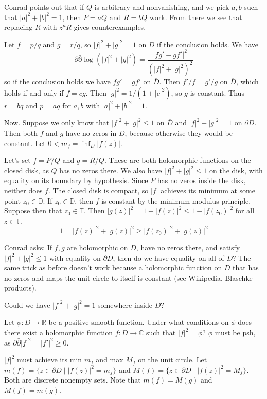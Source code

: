 \documentclass[11pt]{amsart}
\theoremstyle{definition}
\newcommand{\kk}[1]{\mathbb{#1}}
\def\ov#1{\overline{#1}}
\begin{document}
Conrad points out that if $Q$ is arbitrary and nonvanishing, and we pick
$a,b$ such that $|a|^2 + |b|^2 = 1$, then $P = aQ$ and $R = bQ$ work.
From there we see that replacing $R$ with $z^n R$ gives counterexamples.


Let $f = p/q$ and $g = r/q$, so $|f|^2 + |g|^2 = 1$ on $D$ if the conclusion holds.
We have
$$
\partial \bar\partial \log(|f|^2 + |g|^2)
=
\frac{|f g' - g f'|^2}{(|f|^2 + |g|^2)^2}
$$
so if the conclusion holds we have $fg' = gf'$ on $\ov D$.
Then $f'/f = g'/g$ on $\ov D$, which holds if and only if $f = c g$.
Then $|g|^2 = 1/(1+|c|^2)$, so $g$ is constant.
Thus $r = bq$ and $p = aq$ for $a,b$ with $|a|^2 + |b|^2 = 1$.

Now.
Suppose we only know that $|f|^2 + |g|^2 \leq 1$ on $\ov D$ and $|f|^2 + |g|^2
= 1$ on $\partial D$.
Then both $f$ and $g$ have no zeros in $D$, because otherwise they would be
constant.
Let $0 < m_f = \inf_{D}|f(z)|$.


Let's set $f = P/Q$ and $g = R/Q$. These are both holomorphic functions on the
closed disk, as $Q$ has no zeros there. We also have $|f|^2 + |g|^2 \leq 1$ on
the disk, with equality on its boundary by hypothesis. Since $P$ has no zeros
inside the disk, neither does $f$. The closed disk is compact, so $|f|$
achieves its minimum at some point $z_0 \in \overline{\mathbb{D}}$. If $z_0 \in
\mathbb{D}$, then $f$ is constant by the minimum modulus principle.
Suppose then that $z_0 \in \mathbb{T}$.
Then $|g(z)|^2 = 1 - |f(z)|^2 \leq 1 - |f(z_0)|^2$ for all $z \in \mathbb{T}$.
$$
1 = |f(z)|^2 + |g(z)|^2
\geq |f(z_0)|^2 + |g(z)|^2
$$

Conrad asks: If $f,g$ are holomorphic on $\ov D$, have no zeros there, and
satisfy $|f|^2 + |g|^2 \leq 1$ with equality on $\partial D$, then do we have
equality on all of $D$?
The same trick as before doesn't work because a holomorphic function on $\ov D$
that has no zeros and maps the unit circle to itself is constant (see
Wikipedia, Blaschke products).

Could we have $|f|^2 + |g|^2 = 1$ somewhere inside $D$?

Let $\phi : \ov D \to \kk R$ be a positive smooth function.
Under what conditions on $\phi$ does there exist a holomorphic function
$f : \ov D \to \kk C$ such that $|f|^2 = \phi$?
$\phi$ must be psh, as $\partial \bar\partial |f|^2 = |f'|^2 \geq 0$.

$|f|^2$ must achieve its min $m_f$ and max $M_f$ on the unit circle.
Let $m(f) = \{ z \in \partial D \mid |f(z)|^2 = m_f\}$
and $M(f) = \{ z \in \partial D \mid |f(z)|^2 = M_f\}$.
Both are discrete nonempty sets.
Note that $m(f) = M(g)$ and $M(f) = m(g)$.
\end{document}

